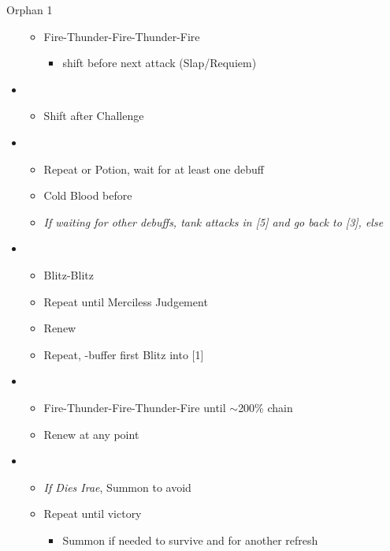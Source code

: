 \begin{battle}{Orphan 1}
\begin{itemize}
			\begin{itemize}
				\item Fire-Thunder-Fire-Thunder-Fire
					\begin{itemize}
						\item shift before next attack (Slap/Requiem)
					\end{itemize}
			\end{itemize}
		\item \fourth
			\begin{itemize}
				\item Shift after Challenge
			\end{itemize}
		\item \third
			\begin{itemize}
				\item Repeat or Potion, wait for at least one debuff
				\item Cold Blood before \stagger
				\item \textit{If waiting for other debuffs, tank attacks in [5] and go back to [3], else}
			\end{itemize}
		\item \sixth
			\begin{itemize}
				\item Blitz-Blitz
				\item Repeat until Merciless Judgement
				\item Renew
				\item Repeat, \rav-buffer first Blitz into [1]
			\end{itemize}
		\item \first
			\begin{itemize}
				\item Fire-Thunder-Fire-Thunder-Fire until $\sim$200\% chain
				\item Renew at any point
			\end{itemize}
		\item \sixth
			\begin{itemize}
				\item \textit{If Dies Irae}, Summon to avoid
				\item Repeat until victory
					\begin{itemize}
						\item Summon if needed to survive and for another refresh
					\end{itemize}
			\end{itemize}
	\end{itemize}
\end{battle}

